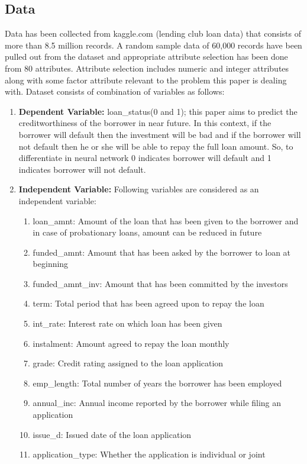 \documentclass{article}[]
\begin{document}
\subsection{Data}
Data has been collected from kaggle.com (lending club loan data) that consists of more than 8.5 million records. A random sample data of 60,000 records have been pulled out from the dataset and appropriate attribute selection has been done from 80 attributes. Attribute selection includes numeric and integer attributes along with some factor attribute relevant to the problem this paper is dealing with. Dataset consists of combination of variables as follows: 
\begin{enumerate}
\item \textbf{Dependent Variable:} loan\_status(0 and 1); this paper aims to predict the creditworthiness of the borrower in near future. In this context, if the borrower will default then the investment will be bad and if the borrower will not default then he or she will be able to repay the full loan amount. So, to differentiate in neural network 0 indicates borrower will default and 1 indicates borrower will not default.
\item \textbf{Independent Variable:} Following variables are considered as an independent variable:
\begin{enumerate}
\item loan\_amnt: Amount of the loan that has been given to the borrower and in case of probationary loans, amount can be reduced in future
\item funded\_amnt: Amount that has been asked by the borrower to loan at beginning
\item funded\_amnt\_inv: Amount that has been committed by the investors
\item term: Total period that has been agreed upon to repay the loan
\item int\_rate: Interest rate on which loan has been given
\item instalment: Amount agreed to repay the loan monthly
\item grade: Credit rating assigned to the loan application
\item emp\_length: Total number of years the borrower has been employed
\item annual\_inc: Annual income reported by the borrower while filing an application 
\item issue\_d: Issued date of the loan application
\item application\_type: Whether the application is individual or joint
\end{enumerate} 
\end{enumerate}
\end{document}
